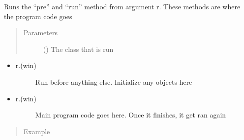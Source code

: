 \documentclass[letterpaper,10pt,english]{sphinxmanual}
\begin{document}
\begin{fulllineitems}
\label{\detokenize{pypoints:pypoints.run}}
Runs the “pre” and “run” method from argument r.
These methods are where the program code goes
\begin{quote}\begin{description}
\item[{Parameters}] \leavevmode
{} () \textendash{} The class that is run

\end{description}\end{quote}
\begin{itemize}
\item {} \begin{description}
\item[{r.(win)}] \leavevmode
Run before anything else.
Initialize any objects here

\end{description}

\item {} \begin{description}
\item[{r.(win)}] \leavevmode
Main program code goes here.
Once it finishes, it get ran again

\end{description}

\end{itemize}
\begin{quote}\begin{description}
\item[{Example}] \leavevmode
\end{description}\end{quote}

\begin{sphinxVerbatim}[commandchars=\\\{\}]
 
      
           
          
             
      
           
             
  
\end{sphinxVerbatim}

\end{fulllineitems}
\end{document}
